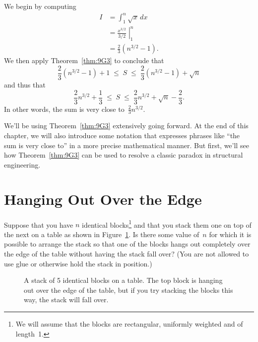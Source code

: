 We begin by computing
\begin{align*}
    I   &= \int_1^n \sqrt{x} \, dx \\
        &= \left. \frac{x^{3/2}}{3/2} \; \right|_1^n \\
        &= \frac{2}{3} (n^{3/2} - 1).
\end{align*}
We then apply Theorem~\ref{thm:9G3} to conclude that
\begin{equation*}
    \frac{2}{3} (n^{3/2} - 1) + 1
    \; \le \; S
    \; \le \; \frac{2}{3} (n^{3/2} - 1) + \sqrt{n}
\end{equation*}
and thus that
\begin{equation*}
    \frac{2}{3} n^{3/2} + \frac{1}{3}
    \; \le \; S
    \; \le \; \frac{2}{3} n^{3/2} + \sqrt{n} - \frac{2}{3}.
\end{equation*}
In other words, the sum is very close to~$\frac{2}{3} n^{3/2}$.

We'll be using Theorem~\ref{thm:9G3} extensively going forward.  At
the end of this chapter, we will also introduce some notation that
expresses phrases like ``the sum is very close to'' in a more precise
mathematical manner.  But first, we'll see how Theorem~\ref{thm:9G3}
can be used to resolve a classic paradox in structural engineering.

\begin{problems}

\classproblems
{}

\homeworkproblems
{}

\end{problems}


\section{Hanging Out Over the Edge}\label{book_stacking_sec}

Suppose that you have $n$ identical blocks\footnote{We will assume
  that the blocks are rectangular, uniformly weighted and of
  length~1.}  and that you stack them one on top of the next on a
table as shown in Figure~\ref{fig:9G11}.  Is there some value of~$n$
for which it is possible to arrange the stack so that one of the
blocks hangs out completely over the edge of the table without having
the stack fall over?  (You are not allowed to use glue or otherwise
hold the stack in position.)

\begin{figure}


\caption{A stack of 5 identical blocks on a table.  The top block is
  hanging out over the edge of the table, but if you try stacking the
  blocks this way, the stack will fall over.}

\label{fig:9G11}

\end{figure}


